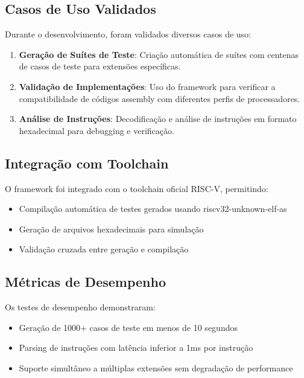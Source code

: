 \documentclass[12pt,a4paper]{article}
\begin{document}
\subsection{Casos de Uso Validados}

Durante o desenvolvimento, foram validados diversos casos de uso:

\begin{enumerate}
    \item \textbf{Geração de Suítes de Teste}: Criação automática de suítes com centenas de casos de teste para extensões específicas.
    
    \item \textbf{Validação de Implementações}: Uso do framework para verificar a compatibilidade de códigos assembly com diferentes perfis de processadores.
    
    \item \textbf{Análise de Instruções}: Decodificação e análise de instruções em formato hexadecimal para debugging e verificação.
\end{enumerate}

\subsection{Integração com Toolchain}

O framework foi integrado com o toolchain oficial RISC-V, permitindo:

\begin{itemize}
    \item Compilação automática de testes gerados usando riscv32-unknown-elf-as
    \item Geração de arquivos hexadecimais para simulação
    \item Validação cruzada entre geração e compilação
\end{itemize}

\subsection{Métricas de Desempenho}

Os testes de desempenho demonstraram:

\begin{itemize}
    \item Geração de 1000+ casos de teste em menos de 10 segundos
    \item Parsing de instruções com latência inferior a 1ms por instrução
    \item Suporte simultâneo a múltiplas extensões sem degradação de performance
\end{itemize}
\end{document}
